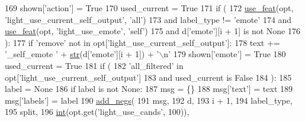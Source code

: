 \begin{DoxyCode}
169                     shown[\textcolor{stringliteral}{'action'}] = \textcolor{keyword}{True}
170                 used\_current = \textcolor{keyword}{True}
171             \textcolor{keywordflow}{if} (
172                 \hyperlink{namespaceparlai_1_1tasks_1_1light__dialog_1_1builder_ad9de2827ebcf8386662e48c7fe011e43}{use\_feat}(opt, \textcolor{stringliteral}{'light\_use\_current\_self\_output'}, \textcolor{stringliteral}{'all'})
173                 \textcolor{keywordflow}{and} label\_type != \textcolor{stringliteral}{'emote'}
174                 \textcolor{keywordflow}{and} \hyperlink{namespaceparlai_1_1tasks_1_1light__dialog_1_1builder_ad9de2827ebcf8386662e48c7fe011e43}{use\_feat}(opt, \textcolor{stringliteral}{'light\_use\_emote'}, \textcolor{stringliteral}{'self'})
175                 \textcolor{keywordflow}{and} d[\textcolor{stringliteral}{'emote'}][i + 1] \textcolor{keywordflow}{is} \textcolor{keywordflow}{not} \textcolor{keywordtype}{None}
176             ):
177                 \textcolor{keywordflow}{if} \textcolor{stringliteral}{'remove'} \textcolor{keywordflow}{not} \textcolor{keywordflow}{in} opt[\textcolor{stringliteral}{'light\_use\_current\_self\_output'}]:
178                     text += \textcolor{stringliteral}{'\_self\_emote '} + \hyperlink{namespacegenerate__task__READMEs_a5b88452ffb87b78c8c85ececebafc09f}{str}(d[\textcolor{stringliteral}{'emote'}][i + 1]) + \textcolor{stringliteral}{'\(\backslash\)n'}
179                     shown[\textcolor{stringliteral}{'emote'}] = \textcolor{keyword}{True}
180                 used\_current = \textcolor{keyword}{True}
181             \textcolor{keywordflow}{if} (
182                 \textcolor{stringliteral}{'all\_filtered'} \textcolor{keywordflow}{in} opt[\textcolor{stringliteral}{'light\_use\_current\_self\_output'}]
183                 \textcolor{keywordflow}{and} used\_current \textcolor{keywordflow}{is} \textcolor{keyword}{False}
184             ):
185                 label = \textcolor{keywordtype}{None}
186             \textcolor{keywordflow}{if} label \textcolor{keywordflow}{is} \textcolor{keywordflow}{not} \textcolor{keywordtype}{None}:
187                 msg = \{\}
188                 msg[\textcolor{stringliteral}{'text'}] = text
189                 msg[\textcolor{stringliteral}{'labels'}] = label
190                 \hyperlink{namespaceparlai_1_1tasks_1_1light__dialog_1_1builder_a2f5cb4927740a90c9fba84df5e8e16b5}{add\_negs}(
191                     msg,
192                     d,
193                     i + 1,
194                     label\_type,
195                     split,
196                     \hyperlink{namespacelanguage__model_1_1eval__ppl_a7d12ee00479673c5c8d1f6d01faa272a}{int}(opt.get(\textcolor{stringliteral}{'light\_use\_cands'}, 100)),

\end{DoxyCode}
